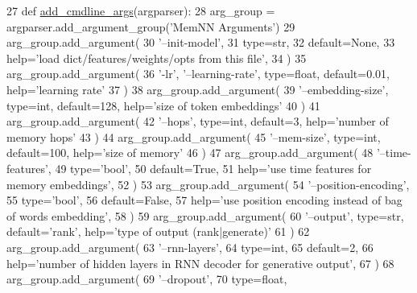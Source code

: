 \begin{DoxyCode}
27     \textcolor{keyword}{def }\hyperlink{namespaceparlai_1_1agents_1_1drqa_1_1config_a62fdd5554f1da6be0cba185271058320}{add\_cmdline\_args}(argparser):
28         arg\_group = argparser.add\_argument\_group(\textcolor{stringliteral}{'MemNN Arguments'})
29         arg\_group.add\_argument(
30             \textcolor{stringliteral}{'--init-model'},
31             type=str,
32             default=\textcolor{keywordtype}{None},
33             help=\textcolor{stringliteral}{'load dict/features/weights/opts from this file'},
34         )
35         arg\_group.add\_argument(
36             \textcolor{stringliteral}{'-lr'}, \textcolor{stringliteral}{'--learning-rate'}, type=float, default=0.01, help=\textcolor{stringliteral}{'learning rate'}
37         )
38         arg\_group.add\_argument(
39             \textcolor{stringliteral}{'--embedding-size'}, type=int, default=128, help=\textcolor{stringliteral}{'size of token embeddings'}
40         )
41         arg\_group.add\_argument(
42             \textcolor{stringliteral}{'--hops'}, type=int, default=3, help=\textcolor{stringliteral}{'number of memory hops'}
43         )
44         arg\_group.add\_argument(
45             \textcolor{stringliteral}{'--mem-size'}, type=int, default=100, help=\textcolor{stringliteral}{'size of memory'}
46         )
47         arg\_group.add\_argument(
48             \textcolor{stringliteral}{'--time-features'},
49             type=\textcolor{stringliteral}{'bool'},
50             default=\textcolor{keyword}{True},
51             help=\textcolor{stringliteral}{'use time features for memory embeddings'},
52         )
53         arg\_group.add\_argument(
54             \textcolor{stringliteral}{'--position-encoding'},
55             type=\textcolor{stringliteral}{'bool'},
56             default=\textcolor{keyword}{False},
57             help=\textcolor{stringliteral}{'use position encoding instead of bag of words embedding'},
58         )
59         arg\_group.add\_argument(
60             \textcolor{stringliteral}{'--output'}, type=str, default=\textcolor{stringliteral}{'rank'}, help=\textcolor{stringliteral}{'type of output (rank|generate)'}
61         )
62         arg\_group.add\_argument(
63             \textcolor{stringliteral}{'--rnn-layers'},
64             type=int,
65             default=2,
66             help=\textcolor{stringliteral}{'number of hidden layers in RNN decoder for generative output'},
67         )
68         arg\_group.add\_argument(
69             \textcolor{stringliteral}{'--dropout'},
70             type=float,

\end{DoxyCode}
